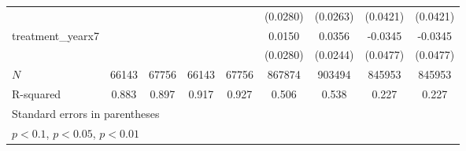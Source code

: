 {\begin{tabular}{l*{8}{c}}
            &                     &                     &                     &                     &    (0.0280)         &    (0.0263)         &    (0.0421)         &    (0.0421)         \\
\addlinespace
treatment\_yearx7&                     &                     &                     &                     &      0.0150         &      0.0356         &     -0.0345         &     -0.0345         \\
            &                     &                     &                     &                     &    (0.0280)         &    (0.0244)         &    (0.0477)         &    (0.0477)         \\
\midrule
\(N\)       &       66143         &       67756         &       66143         &       67756         &      867874         &      903494         &      845953         &      845953         \\
R-squared   &       0.883         &       0.897         &       0.917         &       0.927         &       0.506         &       0.538         &       0.227         &       0.227         \\
\bottomrule
\multicolumn{9}{l}{\footnotesize Standard errors in parentheses}\\
\multicolumn{9}{l}{\footnotesize \sym{*} \(p<0.1\), \sym{**} \(p<0.05\), \sym{***} \(p<0.01\)}\\
\end{tabular}
}
